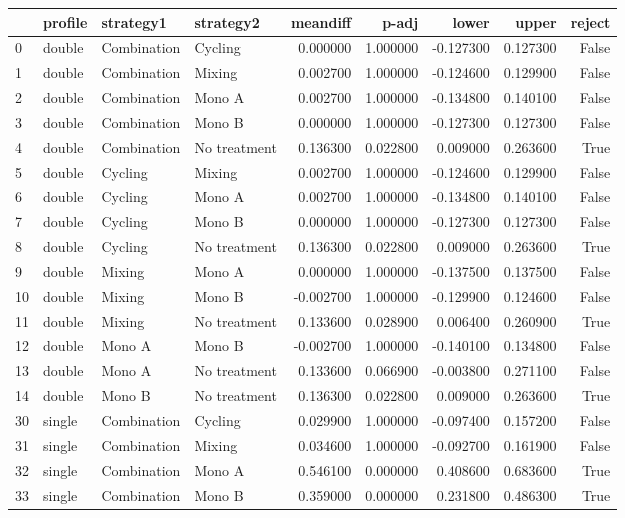 \begin{tabular}{llllrrrrr}
\toprule
 & profile & strategy1 & strategy2 & meandiff & p-adj & lower & upper & reject \\
\midrule
0 & double & Combination & Cycling & 0.000000 & 1.000000 & -0.127300 & 0.127300 & False \\
1 & double & Combination & Mixing & 0.002700 & 1.000000 & -0.124600 & 0.129900 & False \\
2 & double & Combination & Mono A & 0.002700 & 1.000000 & -0.134800 & 0.140100 & False \\
3 & double & Combination & Mono B & 0.000000 & 1.000000 & -0.127300 & 0.127300 & False \\
4 & double & Combination & No treatment & 0.136300 & 0.022800 & 0.009000 & 0.263600 & True \\
5 & double & Cycling & Mixing & 0.002700 & 1.000000 & -0.124600 & 0.129900 & False \\
6 & double & Cycling & Mono A & 0.002700 & 1.000000 & -0.134800 & 0.140100 & False \\
7 & double & Cycling & Mono B & 0.000000 & 1.000000 & -0.127300 & 0.127300 & False \\
8 & double & Cycling & No treatment & 0.136300 & 0.022800 & 0.009000 & 0.263600 & True \\
9 & double & Mixing & Mono A & 0.000000 & 1.000000 & -0.137500 & 0.137500 & False \\
10 & double & Mixing & Mono B & -0.002700 & 1.000000 & -0.129900 & 0.124600 & False \\
11 & double & Mixing & No treatment & 0.133600 & 0.028900 & 0.006400 & 0.260900 & True \\
12 & double & Mono A & Mono B & -0.002700 & 1.000000 & -0.140100 & 0.134800 & False \\
13 & double & Mono A & No treatment & 0.133600 & 0.066900 & -0.003800 & 0.271100 & False \\
14 & double & Mono B & No treatment & 0.136300 & 0.022800 & 0.009000 & 0.263600 & True \\
30 & single & Combination & Cycling & 0.029900 & 1.000000 & -0.097400 & 0.157200 & False \\
31 & single & Combination & Mixing & 0.034600 & 1.000000 & -0.092700 & 0.161900 & False \\
32 & single & Combination & Mono A & 0.546100 & 0.000000 & 0.408600 & 0.683600 & True \\
33 & single & Combination & Mono B & 0.359000 & 0.000000 & 0.231800 & 0.486300 & True \\

\end{tabular}
